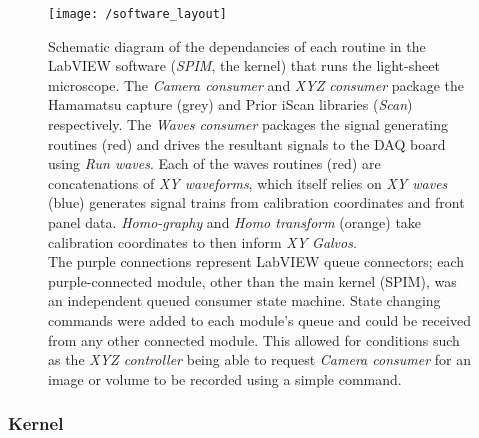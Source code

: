 
\begin{figure}
    \centering
    \texttt{[image: /software\_layout]}
    \caption[Schematic diagram of the dependancies of each routine in the \gls{LabVIEW} software (\emph{SPIM}, the kernel) that runs the light-sheet microscope]{
    Schematic diagram of the dependancies of each routine in the \gls{LabVIEW} software (\emph{SPIM}, the kernel) that runs the light-sheet microscope.
    The \emph{Camera consumer} and \emph{XYZ consumer} package the Hamamatsu capture (grey) and Prior iScan libraries (\emph{Scan}) respectively.
    The \emph{Waves consumer} packages the signal generating routines (red) and drives the resultant signals to the DAQ board using \emph{Run waves}.
    Each of the waves routines (red) are concatenations of \emph{XY waveforms}, which itself relies on \emph{XY waves} (blue) generates signal trains from calibration coordinates and front panel data.
    \emph{Homo-graphy} and \emph{Homo transform} (orange) take calibration coordinates to then inform \emph{XY Galvos}.\\
    The purple connections represent \gls{LabVIEW} queue connectors; each purple-connected module, other than the main kernel (SPIM), was an independent queued consumer state machine.
    State changing commands were added to each module's queue and could be received from any other connected module.
    This allowed for conditions such as the \emph{XYZ controller} being able to request \emph{Camera consumer} for an image or volume to be recorded using a simple  command.
    }\label{fig:software_layout}
\end{figure}

\subsubsection{Kernel}


